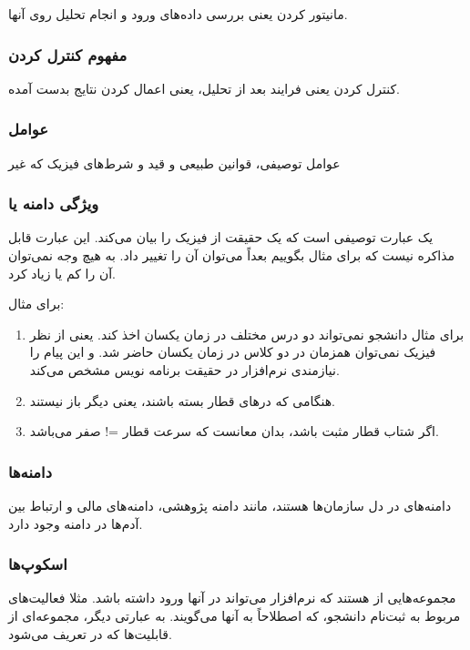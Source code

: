 مانیتور کردن یعنی بررسی داده‌های ورود و انجام تحلیل روی آنها.

\subsubsection{مفهوم کنترل کردن}

کنترل کردن یعنی فرایند بعد از تحلیل، یعنی اعمال کردن نتایج بدست آمده.

\subsubsection{عوامل }

عوامل توصیفی، قوانین طبیعی و قید و شرط‌های فیزیک که غیر 

\subsubsection{ویژگی دامنه یا }

یک عبارت توصیفی است که یک حقیقت از فیزیک را بیان می‌کند. این عبارت قابل مذاکره
نیست که برای مثال بگوییم بعداً می‌توان آن را تغییر داد. به هیچ وجه نمی‌توان آن
را کم یا زیاد کرد.

برای مثال:

\begin{enumerate}
    \item برای مثال دانشجو نمی‌تواند دو درس مختلف در زمان یکسان اخذ کند. یعنی از
    نظر فیزیک نمی‌توان همزمان در دو کلاس در زمان یکسان حاضر شد. و این پیام را
    نیازمندی نرم‌افزار در حقیقت برنامه نویس مشخص می‌کند.
    \item هنگامی که در‌های قطار بسته باشند، یعنی دیگر باز نیستند.
    \item اگر شتاب قطار مثبت باشد، بدان معانست که سرعت قطار =! صفر می‌باشد.
\end{enumerate}

\subsubsection{دامنه‌ها}

دامنه‌های در دل سازمان‌ها هستند، مانند دامنه پژوهشی، دامنه‌های مالی و ارتباط بین
آدم‌ها در دامنه وجود دارد.

\subsubsection{اسکوپ‌ها}

مجموعه‌هایی از  هستند که نرم‌افزار می‌تواند در آنها ورود
داشته باشد. مثلا فعالیت‌های مربوط به ثبت‌نام دانشجو، که اصطلاحاً به آنها
 می‌گویند. به عبارتی دیگر، مجموعه‌ای از قابلیت‌ها که در
 تعریف می‌شود.

